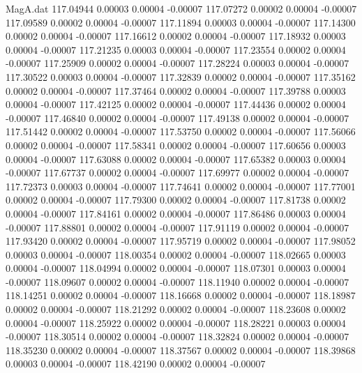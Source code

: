 \begin{filecontents}{MagA.dat}
 117.04944    0.00003    0.00004   -0.00007
 117.07272    0.00002    0.00004   -0.00007
 117.09589    0.00002    0.00004   -0.00007
 117.11894    0.00003    0.00004   -0.00007
 117.14300    0.00002    0.00004   -0.00007
 117.16612    0.00002    0.00004   -0.00007
 117.18932    0.00003    0.00004   -0.00007
 117.21235    0.00003    0.00004   -0.00007
 117.23554    0.00002    0.00004   -0.00007
 117.25909    0.00002    0.00004   -0.00007
 117.28224    0.00003    0.00004   -0.00007
 117.30522    0.00003    0.00004   -0.00007
 117.32839    0.00002    0.00004   -0.00007
 117.35162    0.00002    0.00004   -0.00007
 117.37464    0.00002    0.00004   -0.00007
 117.39788    0.00003    0.00004   -0.00007
 117.42125    0.00002    0.00004   -0.00007
 117.44436    0.00002    0.00004   -0.00007
 117.46840    0.00002    0.00004   -0.00007
 117.49138    0.00002    0.00004   -0.00007
 117.51442    0.00002    0.00004   -0.00007
 117.53750    0.00002    0.00004   -0.00007
 117.56066    0.00002    0.00004   -0.00007
 117.58341    0.00002    0.00004   -0.00007
 117.60656    0.00003    0.00004   -0.00007
 117.63088    0.00002    0.00004   -0.00007
 117.65382    0.00003    0.00004   -0.00007
 117.67737    0.00002    0.00004   -0.00007
 117.69977    0.00002    0.00004   -0.00007
 117.72373    0.00003    0.00004   -0.00007
 117.74641    0.00002    0.00004   -0.00007
 117.77001    0.00002    0.00004   -0.00007
 117.79300    0.00002    0.00004   -0.00007
 117.81738    0.00002    0.00004   -0.00007
 117.84161    0.00002    0.00004   -0.00007
 117.86486    0.00003    0.00004   -0.00007
 117.88801    0.00002    0.00004   -0.00007
 117.91119    0.00002    0.00004   -0.00007
 117.93420    0.00002    0.00004   -0.00007
 117.95719    0.00002    0.00004   -0.00007
 117.98052    0.00003    0.00004   -0.00007
 118.00354    0.00002    0.00004   -0.00007
 118.02665    0.00003    0.00004   -0.00007
 118.04994    0.00002    0.00004   -0.00007
 118.07301    0.00003    0.00004   -0.00007
 118.09607    0.00002    0.00004   -0.00007
 118.11940    0.00002    0.00004   -0.00007
 118.14251    0.00002    0.00004   -0.00007
 118.16668    0.00002    0.00004   -0.00007
 118.18987    0.00002    0.00004   -0.00007
 118.21292    0.00002    0.00004   -0.00007
 118.23608    0.00002    0.00004   -0.00007
 118.25922    0.00002    0.00004   -0.00007
 118.28221    0.00003    0.00004   -0.00007
 118.30514    0.00002    0.00004   -0.00007
 118.32824    0.00002    0.00004   -0.00007
 118.35230    0.00002    0.00004   -0.00007
 118.37567    0.00002    0.00004   -0.00007
 118.39868    0.00003    0.00004   -0.00007
 118.42190    0.00002    0.00004   -0.00007

\end{filecontents}
